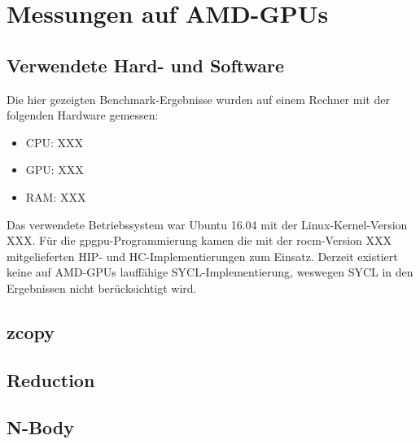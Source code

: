 \section{Messungen auf AMD-GPUs}
\label{amd}

\subsection{Verwendete Hard- und Software}

Die hier gezeigten Benchmark-Ergebnisse wurden auf einem Rechner mit der
folgenden Hardware gemessen:

\begin{itemize}
    \item CPU: XXX
    \item GPU: XXX
    \item RAM: XXX
\end{itemize}

Das verwendete Betriebssystem war Ubuntu 16.04 mit der Linux-Kernel-Version XXX.
Für die \gls{gpgpu}-Programmierung kamen die mit der \gls{rocm}-Version XXX
mitgelieferten HIP- und HC-Implementierungen zum Einsatz. Derzeit existiert
keine auf AMD-GPUs lauffähige SYCL-Implementierung, weswegen SYCL in den
Ergebnissen nicht berücksichtigt wird.

\subsection{zcopy}

\subsection{Reduction}

\subsection{N-Body}
